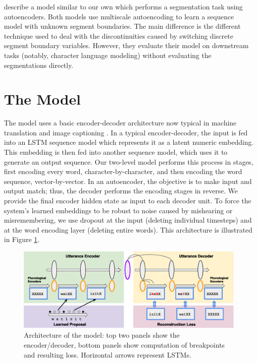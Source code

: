\documentclass[11pt,letterpaper]{article}
\begin{document}
 describe a model similar to our own which performs a
segmentation task using autoencoders. Both models use multiscale
autoencoding to learn a sequence model with unknown segment
boundaries. The main difference is the different technique used to
deal with the discontinuities caused by switching discrete segment
boundary variables. However, they evaluate their model on downstream
tasks (notably, character language modeling) without evaluating the
segmentations directly.

\section{The Model}

The model uses a basic encoder-decoder architecture now typical in
machine translation \cite{Cho14} and image captioning
\cite{Vinyals15}. In a typical encoder-decoder, the input is fed into
an LSTM sequence model \cite{Hochreiter97} which represents it as a
latent numeric embedding. This embedding is then fed into another
sequence model, which uses it to generate an output sequence. Our
two-level model performs this process in stages, first encoding every
word, character-by-character, and then encoding the word sequence,
vector-by-vector. In an autoencoder, the objective is to make input
and output match; thus, the decoder performs the encoding stages in
reverse. We provide the final encoder hidden state as input to each
decoder unit. To force the system's learned embeddings to be robust to
noise caused by mishearing or misremembering, we use dropout
\cite{Srivastava14} at the input (deleting individual timesteps) and
at the word encoding layer (deleting entire words). This architecture
is illustrated in Figure \ref{fig-arch}.

\begin{figure}
\includegraphics[width=\textwidth]{arch.eps}
\caption{Architecture of the model: top two panels show the
  encoder/decoder, bottom panels show computation of breakpoints and
  resulting loss. Horizontal arrows represent LSTMs.}
\label{fig-arch}
\end{figure}
\end{document}
